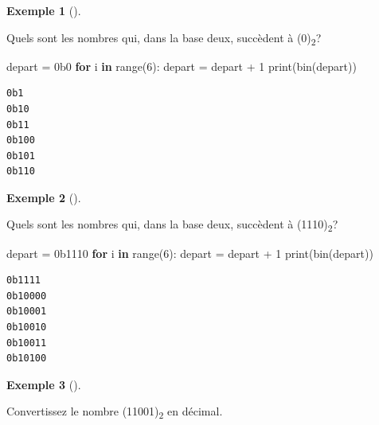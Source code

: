 \documentclass[
  letterpaper,
]{scrbook}
\newenvironment{Shaded}{\begin{snugshade}}{\end{snugshade}}
\newcommand{\BaseNTok}[1]{\textcolor[rgb]{0.25,0.63,0.44}{#1}}
\newcommand{\BuiltInTok}[1]{\textcolor[rgb]{0.00,0.50,0.00}{#1}}
\newcommand{\ControlFlowTok}[1]{\textcolor[rgb]{0.00,0.44,0.13}{\textbf{#1}}}
\newcommand{\DecValTok}[1]{\textcolor[rgb]{0.25,0.63,0.44}{#1}}
\newcommand{\KeywordTok}[1]{\textcolor[rgb]{0.00,0.44,0.13}{\textbf{#1}}}
\newcommand{\NormalTok}[1]{\textcolor[rgb]{0.00,0.44,0.13}{#1}}
\newcommand{\OperatorTok}[1]{\textcolor[rgb]{0.40,0.40,0.40}{#1}}
\theoremstyle{plain}
\theoremstyle{definition}
\theoremstyle{definition}
\newtheorem{example}{Exemple}[chapter]
\theoremstyle{remark}
\begin{document}
\begin{example}[]\protect\hypertarget{exm-nombres-succedent-0-base-2-1}{}\label{exm-nombres-succedent-0-base-2-1}

Quels sont les nombres qui, dans la base deux, succèdent à
(0)\textsubscript{2}?

\begin{Shaded}
\begin{Highlighting}[]
\NormalTok{depart }\OperatorTok{=} \BaseNTok{0b0}
\ControlFlowTok{for}\NormalTok{ i }\KeywordTok{in} \BuiltInTok{range}\NormalTok{(}\DecValTok{6}\NormalTok{):}
\NormalTok{    depart }\OperatorTok{=}\NormalTok{ depart }\OperatorTok{+} \DecValTok{1}
    \BuiltInTok{print}\NormalTok{(}\BuiltInTok{bin}\NormalTok{(depart))}
\end{Highlighting}
\end{Shaded}

\begin{verbatim}
0b1
0b10
0b11
0b100
0b101
0b110
\end{verbatim}

\end{example}

\begin{example}[]\protect\hypertarget{exm-nombres-succedent-0-base-2-2}{}\label{exm-nombres-succedent-0-base-2-2}

Quels sont les nombres qui, dans la base deux, succèdent à
(1110)\textsubscript{2}?

\begin{Shaded}
\begin{Highlighting}[]
\NormalTok{depart }\OperatorTok{=} \BaseNTok{0b1110}
\ControlFlowTok{for}\NormalTok{ i }\KeywordTok{in} \BuiltInTok{range}\NormalTok{(}\DecValTok{6}\NormalTok{):}
\NormalTok{    depart }\OperatorTok{=}\NormalTok{ depart }\OperatorTok{+} \DecValTok{1}
    \BuiltInTok{print}\NormalTok{(}\BuiltInTok{bin}\NormalTok{(depart))}
\end{Highlighting}
\end{Shaded}

\begin{verbatim}
0b1111
0b10000
0b10001
0b10010
0b10011
0b10100
\end{verbatim}

\end{example}

\begin{example}[]\protect\hypertarget{exm-11001-en-decimal}{}\label{exm-11001-en-decimal}

Convertissez le nombre (11001)\textsubscript{2} en décimal.

\end{example}
\end{document}
